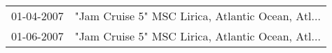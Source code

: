 \begin{supertabular}{ll}
 01-04-2007 &  "Jam Cruise 5" MSC Lirica, Atlantic Ocean, Atl... \\
 01-06-2007 &  "Jam Cruise 5" MSC Lirica, Atlantic Ocean, Atl... \\
\end{supertabular}
